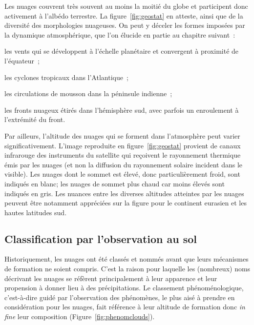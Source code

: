 \sk
Les nuages couvrent très souvent au moins la moitié du globe et participent donc activement à l'albédo terrestre. La figure~\ref{fig:geostat} en atteste, ainsi que de la diversité des morphologies nuageuses. On peut y déceler les formes imposées par la dynamique atmosphérique, que l'on élucide en partie au chapitre suivant~:
\begin{citemize}
\item les vents qui se développent à l'échelle planétaire et convergent à proximité de l'équateur~;
\item les cyclones tropicaux dans l'Atlantique~;
\item les circulations de mousson dans la péninsule indienne~;
\item les fronts nuageux étirés dans l'hémisphère sud, avec parfois un enroulement à l'extrémité du front.
\end{citemize}


\sk
Par ailleurs, l'altitude des nuages qui se forment dans l'atmosphère peut varier significativement. L'image reproduite en figure~\ref{fig:geostat} provient de canaux infrarouge des instruments du satellite qui reçoivent le rayonnement thermique émis par les nuages (et non la diffusion du rayonnement solaire incident dans le visible). Les nuages dont le sommet est élevé, donc particulièrement froid, sont indiqués en blanc; les nuages de sommet plus chaud car moins élevés sont indiqués en gris. Les nuances entre les diverses altitudes atteintes par les nuages peuvent être notamment appréciées sur la figure pour le continent eurasien et les hautes latitudes sud.

\sk
\subsection{Classification par l'observation au sol}

\sk
Historiquement, les nuages ont été classés et nommés avant que leurs mécanismes de formation ne soient compris. C'est la raison pour laquelle les (nombreux) noms décrivant les nuages se réfèrent principalement à leur apparence et leur propension à donner lieu à des précipitations. Le classement phénoménologique, c'est-à-dire guidé par l'observation des phénomènes, le plus aisé à prendre en considération pour les nuages, fait référence à leur altitude de formation donc \emph{in fine} leur composition (Figure~\ref{fig:phenomclouds}).

